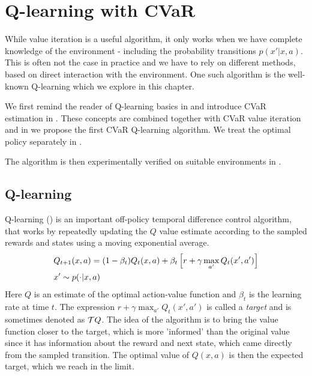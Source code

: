 \chapter{Q-learning with CVaR}\label{ch:qlearning}

While value iteration is a useful algorithm, it only works when we have complete knowledge of the environment - including the probability transitions $p(x'|x,a)$. This is often not the case in practice and we have to rely on different methods, based on direct interaction with the environment. One such algorithm is the well-known Q-learning which we explore in this chapter.

We first remind the reader of Q-learning basics in  and introduce CVaR estimation in . These concepts are combined together with CVaR value iteration and in  we propose the first CVaR Q-learning algorithm. We treat the optimal policy separately in .

The algorithm is then experimentally verified on suitable environments in .

\section{Q-learning}\label{sec:qlearning}

Q-learning (\citet{watkins1992q}) is an important off-policy temporal difference control algorithm, that works by repeatedly updating the $Q$ value estimate according to the sampled rewards and states using a moving exponential average.
\begin{equation}
\begin{split}
&Q_{t+1}(x, a) = (1-\beta_t)Q_{t}(x, a) + \beta_t\left[ {r + \gamma \max_{a'} Q_t(x', a')} \right]\\
&x' \sim p(\cdot|x, a)
\end{split}
\end{equation}
Here $Q$ is an estimate of the optimal action-value function  and $\beta_t$ is the learning rate at time $t$. The expression $r + \gamma \max_{a'} Q_t(x', a')$ is called a \textit{target} and is sometimes denoted as $\mathcal{T} Q$. The idea of the algorithm is to bring the value function closer to the target, which is more 'informed' than the original value since it has information about the reward and next state, which came directly from the sampled transition. The optimal value of $Q(x, a)$ is then the expected target, which we reach in the limit.

